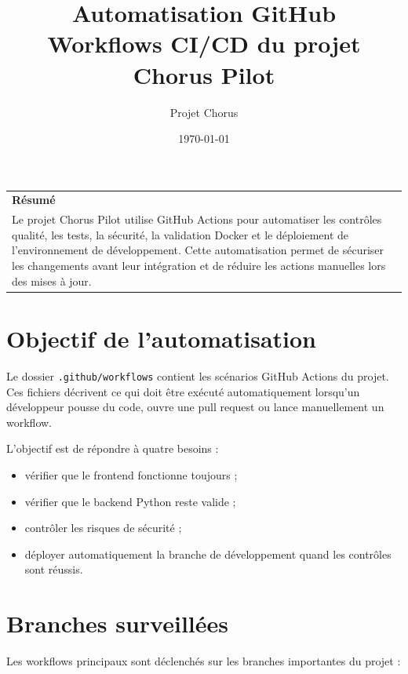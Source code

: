 \documentclass[11pt,a4paper]{article}
\title{
  \vspace{-1.5cm}
  \textbf{\Huge Automatisation GitHub}\\
  \vspace{0.3cm}
  \Large Workflows CI/CD du projet Chorus Pilot
}
\author{Projet Chorus}
\date{\today}
\begin{document}
\maketitle
\thispagestyle{empty}

\begin{center}
  \vspace{0.5cm}
  \begin{tabularx}{0.9\textwidth}{|X|}
    \hline
    \textbf{Résumé} \\
    Le projet Chorus Pilot utilise GitHub Actions pour automatiser les
    contrôles qualité, les tests, la sécurité, la validation Docker et le
    déploiement de l'environnement de développement. Cette automatisation permet
    de sécuriser les changements avant leur intégration et de réduire les actions
    manuelles lors des mises à jour. \\
    \hline
  \end{tabularx}
\end{center}

\newpage
\tableofcontents
\newpage

\section{Objectif de l'automatisation}

Le dossier \texttt{.github/workflows} contient les scénarios GitHub Actions du
projet. Ces fichiers décrivent ce qui doit être exécuté automatiquement lorsqu'un
développeur pousse du code, ouvre une pull request ou lance manuellement un
workflow.

L'objectif est de répondre à quatre besoins :

\begin{itemize}
  \item vérifier que le frontend fonctionne toujours ;
  \item vérifier que le backend Python reste valide ;
  \item contrôler les risques de sécurité ;
  \item déployer automatiquement la branche de développement quand les contrôles
        sont réussis.
\end{itemize}

\section{Branches surveillées}

Les workflows principaux sont déclenchés sur les branches importantes du projet :
\end{document}
